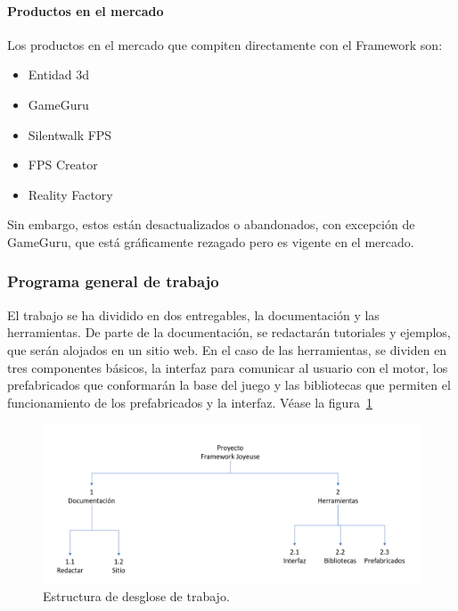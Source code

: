 \documentclass[]{article}
\begin{document}
\paragraph{Productos en el mercado}
Los productos en el mercado que compiten directamente con el Framework son: 
\begin{itemize}
	\item Entidad 3d
	\item GameGuru
	\item Silentwalk FPS 
	\item FPS Creator
	\item Reality Factory
	
\end{itemize}
Sin embargo, estos est\'an desactualizados o abandonados, con excepci\'on de GameGuru, que est\'a gr\'aficamente rezagado pero es vigente en el mercado. 

\subsubsection{Programa general de trabajo}

El trabajo se ha dividido en dos entregables, la documentaci\'on y las herramientas. De parte de la documentaci\'on, se redactar\'an tutoriales y ejemplos, que ser\'an alojados en un sitio web. \newline
En el caso de las herramientas, se dividen en tres componentes b\'asicos, la interfaz para comunicar al usuario con el motor, los prefabricados que conformar\'an la base del juego y las bibliotecas que permiten el funcionamiento de los prefabricados y la interfaz. V\'ease la figura~\ref{EDT2}

\begin{figure}[H]
	
	\centering
	\includegraphics[width=1\textwidth]{EDT}
	\caption{Estructura de desglose de trabajo.} 
	\label{EDT2}
	
\end{figure}
\end{document}
